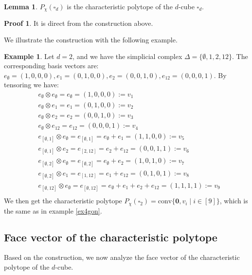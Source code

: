 \documentclass[12pt]{article}
\theoremstyle{definition}
\newtheorem{lemma}[thm]{Lemma}
\newtheorem*{pf}{Proof}
\newtheorem{ex}[thm]{Example}
\numberwithin{equation}{subsection}
\begin{document}
\begin{lemma}
    $P_{\chi}(\square_{d})$ is the characteristic polytope of the $d$-cube $\square_{d}$.
\end{lemma}
\begin{pf}
    It is direct from the construction above.
\end{pf}
We illustrate the construction with the following example.
\begin{ex}
    Let $d = 2$, and we have the simplicial complex $\Delta = \{\emptyset, 1, 2, 12\}$. The corresponding basis vectors are:
    $e_{\emptyset} = (1,0,0,0), 
    e_{1} =(0,1,0,0), 
    e_{2} =(0,0,1,0), 
    e_{12} =(0,0,0,1)$.
    By tensoring we have:
    \begin{align*}
        &e_{\emptyset} \otimes e_{\emptyset} = e_{\emptyset} = (1,0,0,0) := v_{1} \\
        &e_{\emptyset} \otimes e_{1} = e_{1} = (0,1,0,0):= v_{2} \\ 
        &e_{\emptyset} \otimes e_{2} = e_{2} = (0,0,1,0):= v_{3} \\ 
        &e_{\emptyset} \otimes e_{12} = e_{12} = (0,0,0,1):= v_{4} \\ 
        &e_{[\emptyset, 1]} \otimes e_{\emptyset} = e_{[\emptyset, 1]} = e_{\emptyset} + e_{1} = (1,1,0,0):= v_{5} \\
        &e_{[\emptyset, 1]} \otimes e_{2} = e_{[2, 12]} = e_{2} + e_{12} = (0,0,1,1):= v_{6} \\
        &e_{[\emptyset, 2]} \otimes e_{\emptyset} = e_{[\emptyset, 2]} = e_{\emptyset} + e_{2} = (1,0,1,0):= v_{7} \\
        &e_{[\emptyset, 2]} \otimes e_{1} = e_{[1, 12]} = e_{1} + e_{12} = (0,1,0,1):= v_{8} \\
        &e_{[\emptyset, 12]} \otimes e_{\emptyset} = e_{[\emptyset, 12]} = e_{\emptyset} + e_{1} + e_{2} + e_{12} = (1,1,1,1):= v_{9} \\
    \end{align*}
    We then get the characteristic polytope $P_{\chi}(\square_{2}) = \text{conv}\{\textbf{0}, v_{i} \mid i \in [9]\}$, which is the same as in example \ref{ex4gon}.
\end{ex}

\subsection{Face vector of the characteristic polytope}
Based on the construction, we now analyze the face vector of the characteristic polytope of the $d$-cube. 
\end{document}

